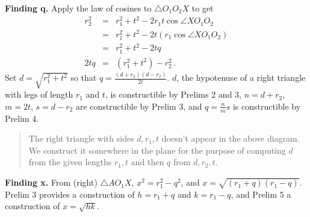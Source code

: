 \textbf{Finding q.} Apply the law of cosines to $\triangle O_1O_2X$ to get
\[
\renewcommand*{\arraystretch}{1.8}
\begin{array}{rcl}
r_2^2 &=& r_1^2 + t^2 - 2r_1t\cos\angle XO_1O_2\\
      &=& r_1^2 + t^2 - 2t(r_1\cos\angle XO_1O_2)\\
&=& r_1^2 + t^2 - 2tq\\
2tq &=& (r_1^2+t^2) - r_2^2\,.
\end{array}
\]
Set $d=\sqrt{r_1^2+t^2}$ so that $q=\frac{(d+r_2)(d-r_2)}{2t}$. $d$, the hypotenuse of a right triangle with legs of length $r_1$ and $t$, is constructible by Prelims 2 and 3, $n= d+ r_2$, $m= 2t$, $s =d -r_2$ are constructible by Prelim 3, and $q=\frac{n}{m}s$ is constructible by Prelim 4.
\begin{quote}
\vspace*{-8pt}
The right triangle with sides $d,r_1,t$ doesn't appear in the above diagram. We construct it somewhere in the plane for the purpose of computing $d$ from the given lengths $r_1,t$ and then $q$ from $d,r_2,t$. 
\vspace*{-8pt}
\end{quote}
\textbf{Finding x.} From (right) $\triangle AO_1X$, $x^2=r_1^2-q^2$, and $x=\sqrt{(r_1+q)(r_1-q)}$. Prelim 3 provides a construction of $h =r_1+ q$ and $k= r_1 - q$, and Prelim 5 a construction of $x= \sqrt{hk}$. 

